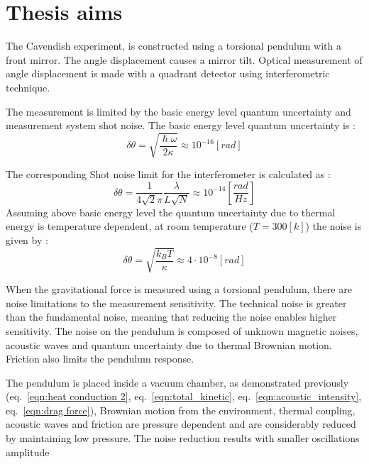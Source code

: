 \documentclass[\main/master.tex]{subfiles}
\begin{document}
\chapter{Thesis aims}\label{chapter:Thesis aims}

The Cavendish experiment, is constructed using a torsional pendulum with a front mirror. The angle displacement causes a mirror tilt. Optical measurement of angle displacement is made with a quadrant detector using interferometric technique.
\par\noindent
The measurement is limited by the basic energy level quantum uncertainty and measurement system shot noise. The basic energy level quantum uncertainty is \cite{howell2019}:
\begin{equation}
\delta\theta= \sqrt{\frac{\hslash\omega}{2\kappa}} \approx 10^{-16} [rad]    \label{eqn:basic uncertainty}
\end{equation}
\par\noindent
The corresponding Shot noise limit for the interferometer is calculated as \cite{howell2019}:
\begin{equation}
\delta\theta = \frac{1}{4\sqrt{2}\pi}\frac{\lambda}{L\sqrt{N}} \approx
10^{-14} [\frac{rad}{Hz}]    \label{eqn:shot limit}
\end{equation}
Assuming above basic energy level the quantum uncertainty due to thermal energy is temperature dependent, at room temperature ($T = 300[k]$) the noise is given by \cite{howell2019}:
\begin{equation}
\delta\theta = \sqrt{\frac{k_B T}{\kappa}} \approx 4\cdot 10^{-8} [rad] \label{eqn:Brownian uncertainty 3}
\end{equation}
\par\noindent
When the gravitational force is measured using a torsional pendulum, there are noise limitations to the measurement sensitivity. The technical noise is greater than the fundamental noise, meaning that reducing the noise enables higher sensitivity. The noise on the pendulum is composed of unknown magnetic noises, acoustic waves and quantum uncertainty due to thermal Brownian motion. Friction also limits the pendulum response. 
\par\noindent
The pendulum is placed inside a vacuum chamber, as demonstrated previously (eq.~\ref{eqn:heat conduction 2}, eq.~\ref{eqn:total_kinetic}, eq.~\ref{eqn:acoustic_intensity}, eq.~\ref{eqn:drag force}), Brownian motion from the environment, thermal coupling, acoustic waves and friction are pressure dependent and are considerably reduced by maintaining low pressure. The noise reduction results with smaller oscillations amplitude %
\end{document}

